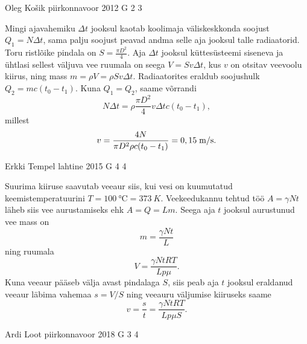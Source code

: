 \documentclass[11pt]{article}
\begin{document}
{%
{Oleg Košik} %
{piirkonnavoor} %
{2012} %
{G 2} %
{3} %
{

\ifSolution
Mingi ajavahemiku $\Delta t$ jooksul kaotab koolimaja väliskeskkonda soojust $Q_1=N\Delta t$, sama palju soojust peavad andma selle aja jooksul talle radiaatorid. Toru ristlõike pindala on $S=\frac{\pi D^2}{4}$. Aja $\Delta t$ jooksul küttesüsteemi siseneva ja ühtlasi sellest väljuva vee ruumala on seega $V=Sv\Delta t$, kus $v$ on otsitav veevoolu kiirus, ning mass $m=\rho V=\rho Sv\Delta t$. Radiaatorites eraldub soojushulk $Q_2=mc(t_0-t_1)$. Kuna $Q_1=Q_2$, saame võrrandi
\[
N\Delta t=\rho \frac{\pi D^2}{4}v\Delta t c (t_0-t_1),
\]
millest
\[
v=\frac{4N}{\pi D^2\rho c (t_0-t_1)}=0,15\;\hbox{m/s}.
\]
\fi
}

{Erkki Tempel} %
{lahtine} %
{2015} %
{G 4} %
{4} %
{

\ifSolution
Suurima kiiruse saavutab veeaur siis, kui vesi on kuumutatud keemistemperatuurini $T=\SI{100}{\celsius}=\SI{373}{K}$. Veekeedukannu tehtud töö $A=\gamma Nt$ läheb siis vee aurustamiseks ehk $A=Q=Lm$. Seega aja $t$ jooksul aurustunud vee mass on
\[
m=\frac{\gamma Nt}{L}
\]
ning ruumala
\[
V=\frac{\gamma NtRT}{Lp\mu}.
\]
Kuna veeaur pääseb välja avast pindalaga $S$, siis peab aja $t$ jooksul eraldanud veeaur läbima vahemaa $s=V/S$ ning veeauru väljumise kiiruseks saame
\[
v=\frac{s}{t}=\frac{\gamma NtRT}{Lp\mu S}.
\]
\fi
}

{Ardi Loot} %
{piirkonnavoor} %
{2018} %
{G 3} %
{4} %
{

}}
\end{document}
